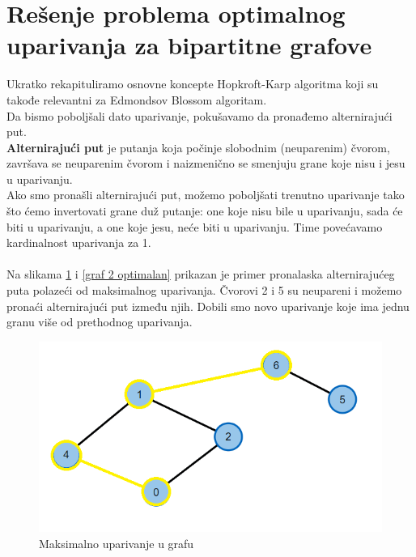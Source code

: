 \documentclass[11pt,a4paper]{article}
\theoremstyle{definition}
\begin{document}
\section{Rešenje problema optimalnog uparivanja za bipartitne grafove}	
Ukratko rekapituliramo osnovne koncepte Hopkroft-Karp algoritma koji su takođe relevantni za Edmondsov Blossom algoritam.\\ Da bismo poboljšali dato uparivanje, pokušavamo da pronađemo alternirajući put.\\ \textbf{ Alternirajući put} je putanja koja počinje slobodnim (neuparenim) čvorom, završava se neuparenim čvorom i naizmenično se smenjuju grane koje nisu i jesu u uparivanju. \\Ako smo pronašli alternirajući put, možemo poboljšati trenutno uparivanje tako što ćemo invertovati grane duž putanje: one koje nisu bile u uparivanju, sada će biti u uparivanju, a one koje jesu, neće biti u uparivanju. Time povećavamo kardinalnost uparivanja za 1. \\ \\
Na slikama \ref{graf 2 maksimalan} i \ref{graf 2 optimalan} prikazan je primer pronalaska alternirajućeg puta polazeći od maksimalnog uparivanja. Čvorovi 2 i 5 su neupareni i možemo pronaći alternirajući put između njih. Dobili smo novo uparivanje koje ima jednu granu više od prethodnog uparivanja.
\begin{figure}[H]
\begin{center}
\includegraphics[scale=0.7]{Graf 2 - maksimalan.png}
\end{center}
\caption{Maksimalno uparivanje u grafu}
\label{graf 2 maksimalan}
\end{figure}
\end{document}
